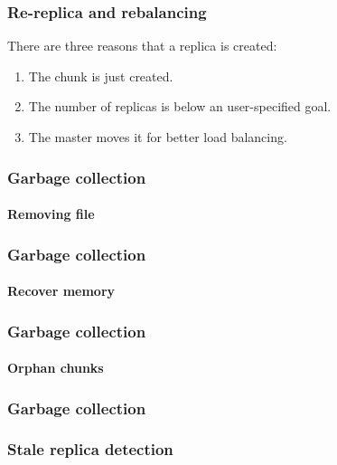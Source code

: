 \documentclass{beamer}
\begin{document}
%
\begin{frame}
 \frametitle{Re-replica and rebalancing}
 There are three reasons that a replica is created:
 \begin{enumerate}
  \item The chunk is just created.
  \item The number of replicas is below an user-specified goal.
  \item The master moves it for better load balancing.
 \end{enumerate}
\end{frame}

\begin{frame}
 \frametitle{Garbage collection}
 \framesubtitle{Removing file}
\end{frame}

\begin{frame}
 \frametitle{Garbage collection}
 \framesubtitle{Recover memory}
\end{frame}

\begin{frame}
 \frametitle{Garbage collection}
 \framesubtitle{Orphan chunks}
\end{frame}

\begin{frame}
 \frametitle{Garbage collection}
 \frametitle{Stale replica detection}
 
\end{frame}
\end{document}
